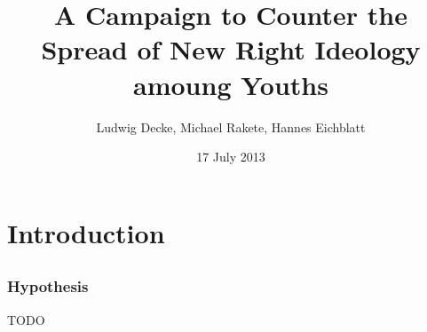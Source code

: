 \documentclass{beamer}
\title{A Campaign to Counter the Spread of New Right Ideology amoung Youths}
\institute{English in Project Management\\Sprachenzentrum der Universität Leipzig}
\author{Ludwig Decke, Michael Rakete, Hannes Eichblatt}
\date{17 July 2013}
\begin{document}

\frame[plain]{\maketitle}

\section{Introduction}
\subsection{}

\begin{frame}
 \frametitle{Hypothesis}
 \begin{block}{TODO}

 \end{block}
\end{frame}
\end{document}
